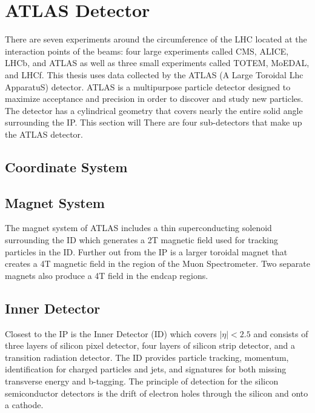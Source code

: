 \section{ATLAS Detector}
There are seven experiments around the circumference of the LHC located at the interaction points of the beams: four large experiments called CMS, ALICE, LHCb, and ATLAS as well as three small experiments called TOTEM, MoEDAL, and LHCf.
This thesis uses data collected by the ATLAS (A Large Toroidal Lhc ApparatuS) detector.
ATLAS is a multipurpose particle detector designed to maximize acceptance and precision in order to discover and study new particles.
The detector has a cylindrical geometry that covers nearly the entire solid angle surrounding the IP.
This section will 
There are four sub-detectors that make up the ATLAS detector.

\subsection{Coordinate System}
\subsection{Magnet System}
The magnet system of ATLAS includes a thin superconducting solenoid surrounding the ID which generates a 2T magnetic field used for tracking particles in the ID.
Further out from the IP is a larger toroidal magnet that creates a 4T magnetic field in the region of the Muon Spectrometer.
Two separate magnets also produce a 4T field in the endcap regions.

\subsection{Inner Detector}
Closest to the IP is the Inner Detector (ID) which covers $|\eta|<2.5$ and consists of three layers of silicon pixel detector, four layers of silicon strip detector, and a transition radiation detector.
The ID provides particle tracking, momentum, identification for charged particles and jets, and signatures for both missing transverse energy and b-tagging.
The principle of detection for the silicon semiconductor detectors is the drift of electron holes through the silicon and onto a cathode. \cite{det-id}

